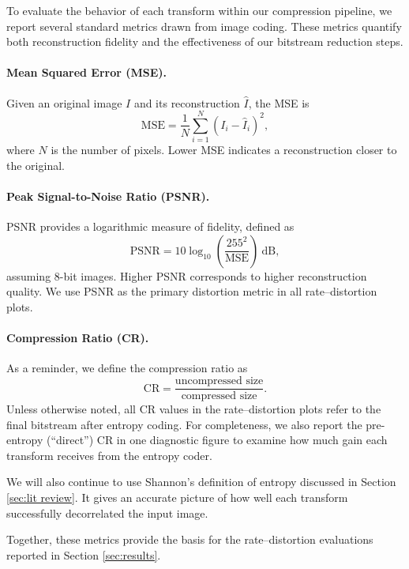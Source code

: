 To evaluate the behavior of each transform within our compression pipeline, we
report several standard metrics drawn from image coding. These metrics quantify
both reconstruction fidelity and the effectiveness of our bitstream reduction
steps.

\paragraph{Mean Squared Error (MSE).}
Given an original image $I$ and its reconstruction $\hat{I}$, the MSE is
\begin{equation}
    \mathrm{MSE}
    = \frac{1}{N} \sum_{i=1}^{N} (I_i - \hat{I}_i)^2,
\end{equation}
where $N$ is the number of pixels. Lower MSE indicates a reconstruction closer
to the original.

\paragraph{Peak Signal-to-Noise Ratio (PSNR).}
PSNR provides a logarithmic measure of fidelity, defined as
\begin{equation}
    \mathrm{PSNR}
    = 10 \log_{10}\!\left(\frac{255^2}{\mathrm{MSE}}\right) \ \mathrm{dB},
\end{equation}
assuming 8-bit images. Higher PSNR corresponds to higher reconstruction
quality. We use PSNR as the primary distortion metric in all rate–distortion
plots.

\paragraph{Compression Ratio (CR).}
As a reminder, we define the compression ratio as
\[
\mathrm{CR} = \frac{\text{uncompressed size}}{\text{compressed size}}.
\]
Unless otherwise noted, all CR values in the rate--distortion plots refer to the 
final bitstream after entropy coding. For completeness, we also report the
pre-entropy (“direct”) CR in one diagnostic figure to examine how much gain each
transform receives from the entropy coder.

We will also continue to use Shannon's definition of entropy discussed in Section \ref{sec:lit review}. It gives an accurate picture of how well each transform successfully decorrelated the input image.

\medskip
Together, these metrics provide the basis for the rate–distortion evaluations
reported in Section \ref{sec:results}.